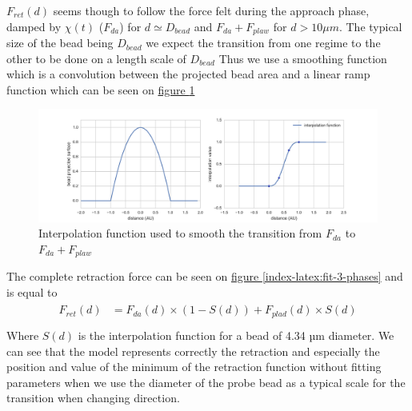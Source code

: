 \documentclass[A4paperpaper,11pt,english]{sphinxmanual}
\begin{document}
\(F_{ret}(d)\) seems though to follow the force felt during the approach phase, damped by \(\chi(t)\) (\(F_{da}\)) for \(d
\simeq{D_{bead}}\) and \(F_{da}+F_{plaw}\) for \(d > 10\mu{}m\).  The
typical size of the bead being \(D_{bead}\) we expect the transition from
one regime to the other to be done on a length scale of \(D_{bead}\) Thus
we use a smoothing function which is a convolution between the projected bead
area and a linear ramp function which can be seen on \hyperref[index-latex:interp]{figure  \ref*{index-latex:interp}}
\begin{figure}[htbp]
\centering
\capstart

\includegraphics[width=0.900\linewidth]{interpolation.png}
\caption{Interpolation function used to smooth the transition from \(F_{da}\) to
\(F_{da}+F_{plaw}\)}\label{index-latex:interp}\end{figure}

The complete retraction force can be seen on \hyperref[index-latex:fit-3-phases]{figure  \ref*{index-latex:fit-3-phases}} and is equal to
\label{index-latex:equation-eqa314}\begin{gather}
\begin{split}F_{ret}(d) &= F_{da}(d)\times(1-S(d)) + F_{plad}(d)\times S(d)\\\end{split}\label{index-latex-eqa314}
\end{gather}
Where \(S(d)\) is the interpolation function for a bead of 4.34 µm
diameter. We can see that the model represents correctly the retraction and especially
the position and value of the minimum of the retraction function without
fitting parameters when we use the diameter of the probe bead as a typical scale
for the transition when changing direction.
\end{document}
